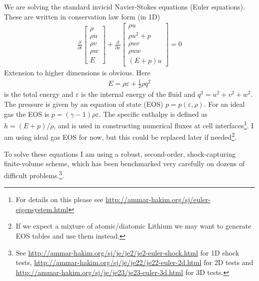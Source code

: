 \documentclass{tufte-handout}
\begin{document}
We are solving the standard invicid Navier-Stokes equations (Euler
equations). These are written in conservation law form (in 1D)
\begin{align}
  \frac{\partial}{\partial{t}}
  \left[
    \begin{matrix}
      \rho \\
      \rho u \\
      \rho v \\
      \rho w \\
      E
    \end{matrix}
  \right]
  +
  \frac{\partial}{\partial{x}}
  \left[
    \begin{matrix}
      \rho u \\
      \rho u^2 + p \\
      \rho uv \\
      \rho uw \\
      (E+p)u
    \end{matrix}
  \right]
  =
  0
\end{align}
Extension to higher dimensions is obvious. Here
\begin{align}
  E = \rho \varepsilon + \frac{1}{2}\rho q^2  
\end{align}
is the total energy and $\varepsilon$ is the internal energy of the
fluid and $q^2=u^2 + v^2 + w^2$. The pressure is given by an equation
of state (EOS) $p=p(\varepsilon, \rho)$. For an ideal gas the EOS is
$p = (\gamma-1)\rho \varepsilon$. The specific enthalpy is defined as
$h = (E+p)/\rho$, and is used in constructing numerical fluxes at cell
interfaces\footnote{For details on this please see
  \url{http://ammar-hakim.org/sj/euler-eigensystem.html}}. I am using
ideal gas EOS for now, but this could be replaced later if
needed\footnote{If we expect a mixture of atomic/diatomic Lithium we
  may want to generate EOS tables and use them instead.}.

To solve these equations I am using a robust, second-order,
shock-capturing finite-volume scheme, which has been benchmarked very
carefully on dozens of difficult problems.\footnote{See
  \url{http://ammar-hakim.org/sj/je/je2/je2-euler-shock.html} for 1D
  shock tests,
  \url{http://ammar-hakim.org/sj/je/je22/je22-euler-2d.html} for 2D
  tests and \url{http://ammar-hakim.org/sj/je/je23/je23-euler-3d.html}
  for 3D tests.}.


\end{document}
